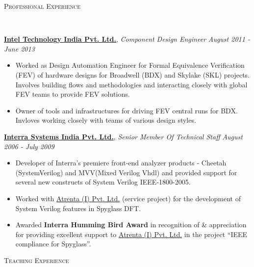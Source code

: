 \documentclass[9pt]{article}
\newenvironment{changemargin}[2]{%
  \begin{list}{}{%
    \setlength{\topsep}{0pt}%
    \setlength{\leftmargin}{#1}%
    \setlength{\rightmargin}{#2}%
    \setlength{\listparindent}{\parindent}%
    \setlength{\itemindent}{\parindent}%
    \setlength{\parsep}{\parskip}%
  }%
  \item[]}{\end{list}
}
\newcommand{\lineover}{
	\begin{changemargin}{-0.05in}{-0.05in}
		\vspace*{-8pt}
		\hrulefill \\
		\vspace*{-2pt}
	\end{changemargin}
}
\newcommand{\header}[1]{
	\begin{changemargin}{-0.5in}{-0.5in}
		\scshape{#1}\\
  	\lineover
	\end{changemargin}
}
\newenvironment{body} {
	\vspace*{-16pt}
	\begin{changemargin}{-0.25in}{-0.5in}
  }	
	{\end{changemargin}
}
\begin{document}
\header{Professional Experience}

\begin{body}
	\vspace{14pt}
	\href{http://www.intel.in/content/www/in/en/homepage.html}{\textbf{Intel Technology India Pvt. Ltd.}}, \emph{Component Design Engineer} \hfill \emph{August 2011 - June 2013}\\
	\vspace*{-4pt}
	\begin{itemize} \itemsep -0pt  %
                \item Worked as Design Automation Engineer for Formal Equivalence Verification (FEV) of hardware designs for Broadwell (BDX) and Skylake (SKL) projects. Involves
                building flows and methodologies and interacting closely with
                global FEV teams to provide FEV solutions.
                \item Owner of tools and infrastructures for driving
                FEV central runs for  BDX. Invloves working closely with teams of various
                design styles.
                \end{itemize}

	\href{http://www.interrasystems.com/}{\textbf {Interra Systems India Pvt. Ltd.}}, \emph{Senior Member Of Technical Staff} \hfill \emph{August 2006 - July 2009}\\
	\vspace*{-4pt}
	\begin{itemize} \itemsep -0pt
		\item Developer of Interra's premiere front-end analyzer products - Cheetah (SystemVerilog) and MVV(Mixed Verilog Vhdl) and 
		provided support for several new constructs of System Verilog IEEE-1800-2005. 
		\item Worked with \href{http://www.atrenta.com/}{Atrenta (I) Pvt. Ltd.} (service project) for the development of System Verilog features in Spyglass DFT.
		\item Awarded \textbf{Interra Humming Bird Award} in recognition of \& appreciation for providing excellent support to \href{}{Atrenta (I) Pvt. Ltd.} in the project ``IEEE compliance for Spyglass''.
	\end{itemize}
\end{body}

\smallskip

\header{Teaching Experience}
\end{document}
